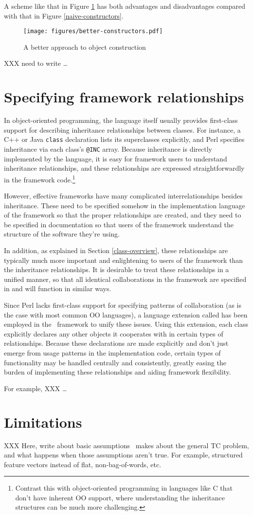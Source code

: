 A scheme like that in Figure \ref{better-constructors} has both
advantages and disadvantages compared with that in Figure
\ref{naive-constructors}.

\begin{figure}
\texttt{[image: figures/better-constructors.pdf]}
\caption{A better approach to object construction}
\label{better-constructors}
\end{figure}

XXX need to write \ldots


\section{Specifying framework relationships}
\label{class-container}

In object-oriented programming, the language itself usually provides
first-class support for describing inheritance relationships between
classes.  For instance, a C++ or Java \texttt{class} declaration lists
its superclasses explicitly, and Perl specifies inheritance via each
class's \texttt{@INC} array.  Because inheritance is directly
implemented by the language, it is easy for framework users to
understand inheritance relationships, and these relationships are
expressed straightforwardly in the framework code.\footnote{Contrast
this with object-oriented programming in languages like C that don't
have inherent OO support, where understanding the inheritance
structures can be much more challenging.\cite[p. 7]{fayad:99}}

However, effective frameworks have many complicated interrelationships
besides inheritance.  These need to be specified somehow in the
implementation language of the framework so that the proper
relationships are created, and they need to be specified in
documentation so that users of the framework understand the structure
of the software they're using.

In addition, as explained in Section \ref{class-overview}, these
relationships are typically much more important and enlightening to
users of the framework than the inheritance relationships.  It is
desirable to treat these relationships in a unified manner, so that
all identical collaborations in the framework are specified in and
will function in similar ways.\cite[p. 13]{fayad:99}

Since Perl lacks first-class support for specifying patterns of
collaboration (as is the case with most common OO languages), a
language extension called  has been employed
in the \aicat\ framework to unify these issues.  Using this extension,
each class explicitly
declares any other objects it cooperates with in certain types of
relationships.  Because these declarations are made explicitly and
don't just emerge from usage patterns in the implementation code,
certain types of functionality may be handled centrally and
consistently, greatly easing the burden of implementing these
relationships and aiding framework flexibility.

For example, XXX \ldots

\section{Limitations}

XXX Here, write about basic assumptions \aicat\ makes about the
general TC problem, and what happens when those assumptions aren't
true.  For example, structured feature vectors instead of flat,
non-bag-of-words, etc.

